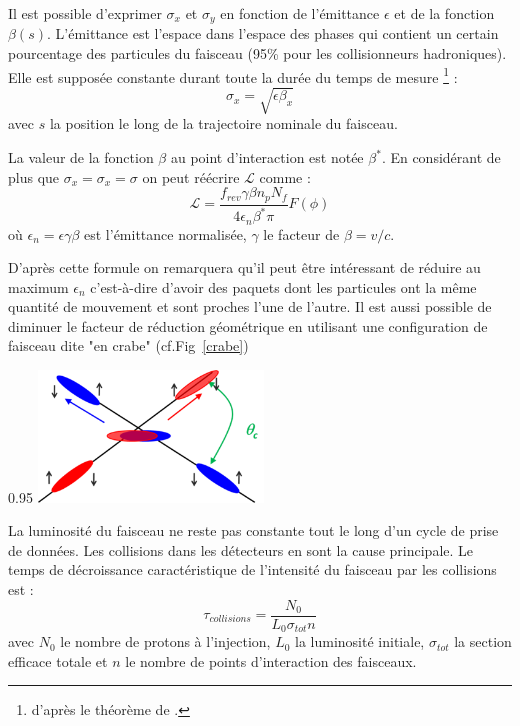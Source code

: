 Il est possible d'exprimer $\sigma_{x}$ et $\sigma_{y}$ en fonction de l'émittance $\epsilon$ et de la fonction $\beta(s)$. L'émittance est l'espace dans l'espace des phases qui contient un certain pourcentage des particules du faisceau (\num{95}\% pour les collisionneurs hadroniques). Elle est supposée constante durant toute la durée du temps de mesure \footnote{d'après le théorème de .} :
\begin{equation}
\sigma_{x}=\sqrt{\epsilon\beta_{x}}
\end{equation}
avec $s$ la position le long de la trajectoire nominale du faisceau.

La valeur de la fonction $\beta$ au point d'interaction est notée $\beta^{*}$. En considérant de plus que $\sigma_{x}=\sigma_{x}=\sigma$ on peut réécrire $\mathcal{L}$ comme :
\begin{equation}
\mathcal{L}=\frac{f_{rev}\gamma\beta n_{p}N_{f}}{4\epsilon_{n}\beta^{*}\pi} F(\phi)
\end{equation}
où $\epsilon_{n}=\epsilon\gamma\beta$ est l'émittance normalisée, $\gamma$ le facteur de  $\beta=v/c$.

D'après cette formule on remarquera qu'il peut être intéressant de réduire au maximum $\epsilon_{n}$ c'est-à-dire d'avoir des paquets dont les particules ont la même quantité de mouvement et sont proches l'une de l'autre. Il est aussi possible de diminuer le facteur de réduction géométrique en utilisant une configuration de faisceau dite "en crabe" (cf.Fig~\ref{crabe})

\begin{minipagewithmarginpars}[ht!]{0.95\textwidth}
\centering
\includegraphics[width=0.45\textwidth]{LHC/crab.png}
\label{crabe}	
\end{minipagewithmarginpars}

La luminosité du faisceau ne reste pas constante tout le long d'un cycle de prise de données. Les collisions dans les détecteurs en sont la cause principale. Le temps de décroissance caractéristique de l'intensité du faisceau par les collisions est :
\begin{equation}
\tau_{collisions}=\frac{N_{0}}{L_{0}\sigma_{tot}n}
\end{equation}
avec $N_{0}$ le nombre de protons à l'injection, $L_{0}$ la luminosité initiale, $\sigma_{tot}$ la section efficace totale et $n$ le nombre de points d'interaction des faisceaux.

